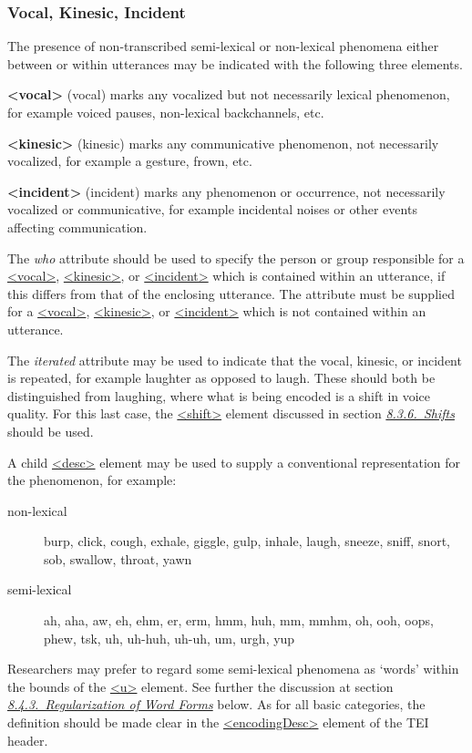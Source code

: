 \subsubsection[{Vocal, Kinesic, Incident}]{Vocal, Kinesic, Incident}\label{TSBAVO}\par
The presence of non-transcribed semi-lexical or non-lexical phenomena either between or within utterances may be indicated with the following three elements. 
\begin{sansreflist}
  
\item [\textbf{<vocal>}] (vocal) marks any vocalized but not necessarily lexical phenomenon, for example voiced pauses, non-lexical backchannels, etc.
\item [\textbf{<kinesic>}] (kinesic) marks any communicative phenomenon, not necessarily vocalized, for example a gesture, frown, etc.
\item [\textbf{<incident>}] (incident) marks any phenomenon or occurrence, not necessarily vocalized or communicative, for example incidental noises or other events affecting communication.
\end{sansreflist}
\par
The {\itshape who} attribute should be used to specify the person or group responsible for a \hyperref[TEI.vocal]{<vocal>}, \hyperref[TEI.kinesic]{<kinesic>}, or \hyperref[TEI.incident]{<incident>} which is contained within an utterance, if this differs from that of the enclosing utterance. The attribute must be supplied for a \hyperref[TEI.vocal]{<vocal>}, \hyperref[TEI.kinesic]{<kinesic>}, or \hyperref[TEI.incident]{<incident>} which is not contained within an utterance.\par
The {\itshape iterated} attribute may be used to indicate that the vocal, kinesic, or incident is repeated, for example laughter as opposed to laugh. These should both be distinguished from laughing, where what is being encoded is a shift in voice quality. For this last case, the \hyperref[TEI.shift]{<shift>} element discussed in section \textit{\hyperref[TSSASH]{8.3.6.\ Shifts}} should be used.\par
A child \hyperref[TEI.desc]{<desc>} element may be used to supply a conventional representation for the phenomenon, for example: \begin{description}

\item[{non-lexical }]burp, click, cough, exhale, giggle, gulp, inhale, laugh, sneeze, sniff, snort, sob, swallow, throat, yawn 
\item[{semi-lexical }]ah, aha, aw, eh, ehm, er, erm, hmm, huh, mm, mmhm, oh, ooh, oops, phew, tsk, uh, uh-huh, uh-uh, um, urgh, yup
\end{description}  Researchers may prefer to regard some semi-lexical phenomena as ‘words’ within the bounds of the \hyperref[TEI.u]{<u>} element. See further the discussion at section \textit{\hyperref[TSREG]{8.4.3.\ Regularization of Word Forms}} below. As for all basic categories, the definition should be made clear in the \hyperref[TEI.encodingDesc]{<encodingDesc>} element of the TEI header.\par
